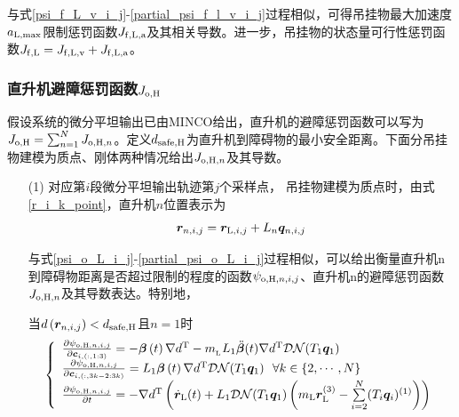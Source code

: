 与式\ref{psi_f_L_v_i_j}-\ref{partial_psi_f_l_v_i_j}过程相似，可得吊挂物最大加速度$a_{\rm{L,max}}$限制惩罚函数$J_{\rm{f,L,a}}$及其相关导数。进一步，吊挂物的状态量可行性惩罚函数$J_{\rm{f,L}} = J_{\rm{f,L,v}} + J_{\rm{f,L,a}}$。

\subsubsection{直升机避障惩罚函数$J_{\rm{o,H}}$}
假设系统的微分平坦输出已由MINCO给出，直升机的避障惩罚函数可以写为$J_{\rm{o,H}}=\sum\nolimits_{n=1}^N J_{{\rm{o,H}},n}$。定义$d_{\rm{safe, H}}$为直升机到障碍物的最小安全距离。下面分吊挂物建模为质点、刚体两种情况给出$J_{{\rm{o,H}},n}$及其导数。
\begin{enumerate}
    \item [(1)] 对应第$i$段微分平坦输出轨迹第$j$个采样点，
    吊挂物建模为质点时，由式\ref{r_i_k_point}，直升机$n$位置表示为
    \begin{equation}
        \boldsymbol{r}_{n,i,j} = \boldsymbol{r}_{{\rm{L}},i,j} + L_n \boldsymbol{q}_{n,i,j} 
    \end{equation}
    
    与式\ref{psi_o_L_i_j}-\ref{partial_psi_o_L_i_j}过程相似，可以给出衡量直升机n到障碍物距离是否超过限制的程度的函数$\psi_{{\rm{o,H}},n,i,j}$、直升机n的避障惩罚函数$J_{{\rm{o,H}},n}$及其导数表达。特别地，
    
    当$d\left({\boldsymbol{r}}_{n,i,j}\right) < d_{\rm{safe, H}}$且$n=1$时
    \begin{equation}
        \left\{\begin{array}{l}
            \frac{\partial \psi_{{\rm{o,H}},n,i,j}}{\partial \boldsymbol{c}_{i,(:,1:3)}} = -\boldsymbol{\beta}\left(t\right)\nabla d^{\rm{T}} - m_{\rm{_L}}L_1 \ddot{\boldsymbol{\beta}}(t) \nabla d^{\rm{T}} \mathcal{DN}(T_1\boldsymbol{q}_1)\\
            \frac{\partial \psi_{{\rm{o,H}},n,i,j}}{\partial \boldsymbol{c}_{i,(:,3k-2:3k)}} = L_1\boldsymbol{\beta}\left(t\right) \nabla d^{\rm{T}}\mathcal{DN}(T_1\boldsymbol{q}_1) \,\,\,\, \forall k \in \left\{ 2, \cdots, N \right\}\\
            \frac{\partial \psi_{{\rm{o,H}},n,i,j}}{\partial t} = -\nabla d^{\rm{T}} \left(
                \dot{\boldsymbol{r}}_{\rm{L}}(t) + L_1\mathcal{DN}(T_1\boldsymbol{q}_1)\left(
                    m_{\rm{L}}\boldsymbol{r}_{\rm{L}}^{(3)}
                    -\sum\limits_{i=2}^N (T_i\boldsymbol{q}_i)^{(1)}
                \right) 
            \right) 
        \end{array}
        \right.
    \end{equation}


\end{enumerate}
